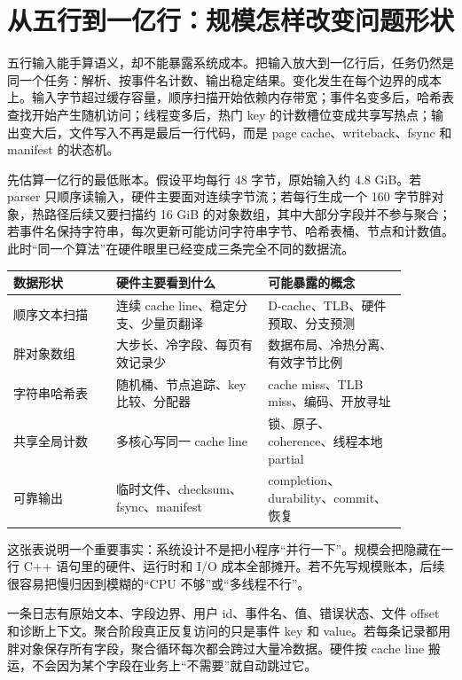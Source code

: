 \section{从五行到一亿行：规模怎样改变问题形状}

五行输入能手算语义，却不能暴露系统成本。把输入放大到一亿行后，任务仍然是同一个任务：解析、按事件名计数、输出稳定结果。变化发生在每个边界的成本上。输入字节超过缓存容量，顺序扫描开始依赖内存带宽；事件名变多后，哈希表查找开始产生随机访问；线程变多后，热门 key 的计数槽位变成共享写热点；输出变大后，文件写入不再是最后一行代码，而是 page cache、writeback、fsync 和 manifest 的状态机。

先估算一亿行的最低账本。假设平均每行 48 字节，原始输入约 4.8 GiB。若 parser 只顺序读输入，硬件主要面对连续字节流；若每行生成一个 160 字节胖对象，热路径后续又要扫描约 16 GiB 的对象数组，其中大部分字段并不参与聚合；若事件名保持字符串，每次更新可能访问字符串字节、哈希表桶、节点和计数值。此时“同一个算法”在硬件眼里已经变成三条完全不同的数据流。

\begin{center}
\begin{tabular}{p{0.23\linewidth}p{0.34\linewidth}p{0.31\linewidth}}
\toprule
数据形状 & 硬件主要看到什么 & 可能暴露的概念 \\
\midrule
顺序文本扫描 & 连续 cache line、稳定分支、少量页翻译 & D-cache、TLB、硬件预取、分支预测 \\
胖对象数组 & 大步长、冷字段、每页有效记录少 & 数据布局、冷热分离、有效字节比例 \\
字符串哈希表 & 随机桶、节点追踪、key 比较、分配器 & cache miss、TLB miss、编码、开放寻址 \\
共享全局计数 & 多核心写同一 cache line & 锁、原子、coherence、线程本地 partial \\
可靠输出 & 临时文件、checksum、fsync、manifest & completion、durability、commit、恢复 \\
\bottomrule
\end{tabular}
\end{center}

这张表说明一个重要事实：系统设计不是把小程序“并行一下”。规模会把隐藏在一行 C++ 语句里的硬件、运行时和 I/O 成本全部摊开。若不先写规模账本，后续很容易把慢归因到模糊的“CPU 不够”或“多线程不行”。

一条日志有原始文本、字段边界、用户 id、事件名、值、错误状态、文件 offset 和诊断上下文。聚合阶段真正反复访问的只是事件 key 和 value。若每条记录都用胖对象保存所有字段，聚合循环每次都会跨过大量冷数据。硬件按 cache line 搬运，不会因为某个字段在业务上“不需要”就自动跳过它。

